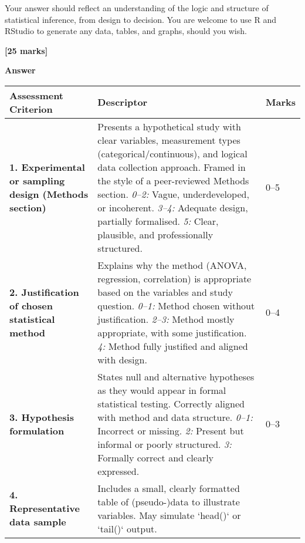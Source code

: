 \documentclass[
  10t,
]{article}
\begin{document}
Your answer should reflect an understanding of the logic and structure
of statistical inference, from design to decision. You are welcome to
use R and RStudio to generate any data, tables, and graphs, should you
wish.

\textbf{{[}25 marks{]}}

\textbf{Answer}

\begin{small}
\begin{raggedright}
\begin{longtable*}{|p{4.2cm}|p{9cm}|p{1.8cm}|}
\hline
\textbf{Assessment Criterion} & \textbf{Descriptor} & \textbf{Marks} \\
\hline
\textbf{1. Experimental or sampling design (Methods section)} & 
Presents a hypothetical study with clear variables, measurement types (categorical/continuous), and logical data collection approach. Framed in the style of a peer-reviewed Methods section. \newline
\textit{0–2:} Vague, underdeveloped, or incoherent. \newline
\textit{3–4:} Adequate design, partially formalised. \newline
\textit{5:} Clear, plausible, and professionally structured. & 
0–5 \\
\hline
\textbf{2. Justification of chosen statistical method} & 
Explains why the method (ANOVA, regression, correlation) is appropriate based on the variables and study question. \newline
\textit{0–1:} Method chosen without justification. \newline
\textit{2–3:} Method mostly appropriate, with some justification. \newline
\textit{4:} Method fully justified and aligned with design. & 
0–4 \\
\hline
\textbf{3. Hypothesis formulation} & 
States null and alternative hypotheses as they would appear in formal statistical testing. Correctly aligned with method and data structure. \newline
\textit{0–1:} Incorrect or missing. \newline
\textit{2:} Present but informal or poorly structured. \newline
\textit{3:} Formally correct and clearly expressed. & 
0–3 \\
\hline
\textbf{4. Representative data sample} & 
Includes a small, clearly formatted table of (pseudo-)data to illustrate variables. May simulate `head()` or `tail()` output. \newline

\end{longtable*}
\end{raggedright}
\end{small}
\end{document}
